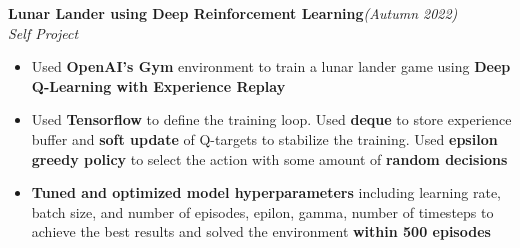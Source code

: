 \documentclass[a4paper,10pt]{article}
\begin{document}
\vspace{\baselineskip}
\vspace{-15pt}
\noindent\textbf{\large Lunar Lander using Deep Reinforcement Learning}\hfill{\sl \small (Autumn 2022)}\\
{\it Self Project}
\\\vspace{-15pt}
\begin{itemize}[itemsep = -0.65 mm, leftmargin=*]
    \item Used \textbf{OpenAI's Gym} environment to train a lunar lander game using \textbf{Deep Q-Learning with Experience Replay}
    \item Used \textbf{Tensorflow} to define the training loop. Used \textbf{deque} to store experience buffer and \textbf{soft update} of Q-targets to stabilize the training. Used \textbf{epsilon greedy policy} to select the action with some amount of \textbf{random decisions}
    \item \textbf{Tuned and optimized model hyperparameters} including learning rate, batch size, and number of episodes,
    epilon, gamma, number of timesteps to achieve the best results and solved the environment \textbf{within 500 episodes}
\end{itemize}
\end{document}
